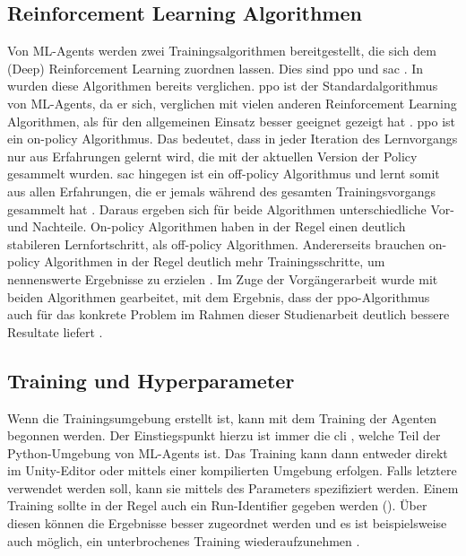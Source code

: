 \subsection{Reinforcement Learning Algorithmen}
Von ML-Agents werden zwei Trainingsalgorithmen bereitgestellt, die sich dem (Deep) Reinforcement Learning zuordnen lassen.
Dies sind \acf{ppo} und \acf{sac} \cite{mlagentsOverview}.
In \cite{waidner.2020} wurden diese Algorithmen bereits verglichen.
\ac{ppo} ist der Standardalgorithmus von ML-Agents, da er sich, verglichen mit vielen anderen Reinforcement Learning Algorithmen, als für den allgemeinen Einsatz besser geeignet gezeigt hat \cite{schulman2017proximal,openaiPPO}.
\ac{ppo} ist ein on-policy Algorithmus.
Das bedeutet, dass in jeder Iteration des Lernvorgangs nur aus Erfahrungen gelernt wird, die mit der aktuellen Version der Policy gesammelt wurden.
\ac{sac} hingegen ist ein off-policy Algorithmus und lernt somit aus allen Erfahrungen, die er jemals während des gesamten Trainingsvorgangs gesammelt hat \cite{suran2020,sagar2020}.
Daraus ergeben sich für beide Algorithmen unterschiedliche Vor- und Nachteile.
On-policy Algorithmen haben in der Regel einen deutlich stabileren Lernfortschritt, als off-policy Algorithmen.
Andererseits brauchen on-policy Algorithmen in der Regel deutlich mehr Trainingsschritte, um nennenswerte Ergebnisse zu erzielen \cite{mlagentsOverview}.
Im Zuge der Vorgängerarbeit wurde mit beiden Algorithmen gearbeitet, mit dem Ergebnis, dass der \ac{ppo}-Algorithmus auch für das konkrete Problem im Rahmen dieser Studienarbeit deutlich bessere Resultate liefert \cite[48]{waidner.2020}.

\subsection{Training und Hyperparameter}
\label{sec:training}
Wenn die Trainingsumgebung erstellt ist, kann mit dem Training der Agenten begonnen werden.
Der Einstiegspunkt hierzu ist immer die \ac{cli} , welche Teil der Python-Umgebung von ML-Agents ist.
Das Training kann dann entweder direkt im Unity-Editor oder mittels einer kompilierten Umgebung erfolgen.
Falls letztere verwendet werden soll, kann sie mittels des Parameters  spezifiziert werden.
Einem Training sollte in der Regel auch ein Run-Identifier gegeben werden ().
Über diesen können die Ergebnisse besser zugeordnet werden und es ist beispielsweise auch möglich, ein unterbrochenes Training wiederaufzunehmen \cite{mlagentsTraining}.

